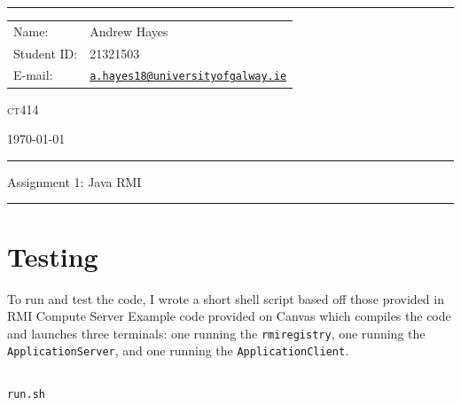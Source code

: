 \documentclass[a4paper]{article}
\newenvironment{code}{\captionsetup{type=listing}}{}
\begin{document}
\hrule \medskip
\begin{minipage}{0.295\textwidth} 
    \raggedright
    \footnotesize 
    \begin{tabular}{@{}l l}
        Name: & Andrew Hayes \\
        Student ID: & 21321503 \\
        E-mail: & \href{mailto://a.hayes18@universityofgalway.ie}{\texttt{a.hayes18@universityofgalway.ie}} \\
    \end{tabular}
\end{minipage}
\begin{minipage}{0.4\textwidth} 
    \centering 
    \vspace{0.4em}
    \LARGE
    \textsc{ct414} \\ 
\end{minipage}
\begin{minipage}{0.295\textwidth} 
    \raggedleft
    \today
\end{minipage}
\medskip\hrule 
\begin{center}
    \normalsize
    Assignment 1: Java RMI
\end{center}
\hrule

\section{Testing}

To run and test the code, I wrote a short shell script based off those provided in RMI Compute Server Example code provided on Canvas which compiles the code and launches three terminals: one running the \texttt{rmiregistry}, one running the \texttt{ApplicationServer}, and one running the \texttt{ApplicationClient}.

\begin{code}
\inputminted[texcl, mathescape, linenos, breaklines, frame=single]{shell}{../code/src/run.sh}
\caption{\texttt{run.sh}}
\end{code}
\end{document}
